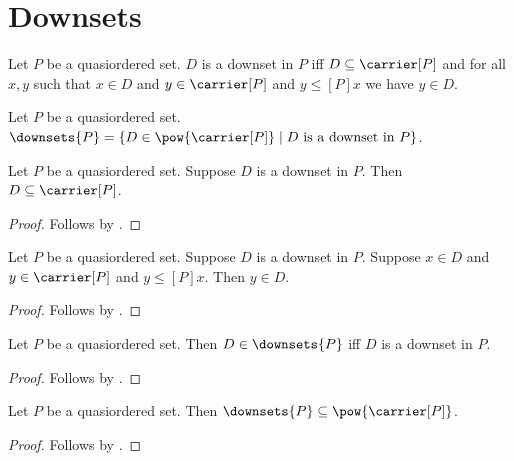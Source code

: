 \section{Downsets}




\begin{definition}\label{downset}
    Let $P$ be a quasiordered set.
    $D$ is a downset in $P$ iff
        $D\subseteq\carrier[P]$ and
        for all $x,y$ such that $x\in D$ and
            $y\in\carrier[P]$ and $y\mathrel{\leq[P]}x$
            we have $y\in D$.
\end{definition}

\begin{definition}\label{downsets}
    Let $P$ be a quasiordered set.
    $\downsets{P}=\{D\in\pow{\carrier[P]}\mid
        \text{$D$ is a downset in $P$}\}$.
\end{definition}

\begin{proposition}\label{downset_subseteq_carrier}
    Let $P$ be a quasiordered set.
    Suppose $D$ is a downset in $P$.
    Then $D\subseteq\carrier[P]$.
\end{proposition}
\begin{proof}
    Follows by .
\end{proof}

\begin{proposition}\label{downset_closed_downward}
    Let $P$ be a quasiordered set.
    Suppose $D$ is a downset in $P$.
    Suppose $x\in D$ and $y\in\carrier[P]$ and
        $y\mathrel{\leq[P]}x$.
    Then $y\in D$.
\end{proposition}
\begin{proof}
    Follows by .
\end{proof}

\begin{proposition}\label{downsets_iff}
    Let $P$ be a quasiordered set.
    Then $D\in\downsets{P}$ iff $D$ is a downset in $P$.
\end{proposition}
\begin{proof}
    Follows by .
\end{proof}

\begin{proposition}\label{downsets_subseteq_powerset}
    Let $P$ be a quasiordered set.
    Then $\downsets{P}\subseteq\pow{\carrier[P]}$.
\end{proposition}
\begin{proof}
    Follows by .
\end{proof}

